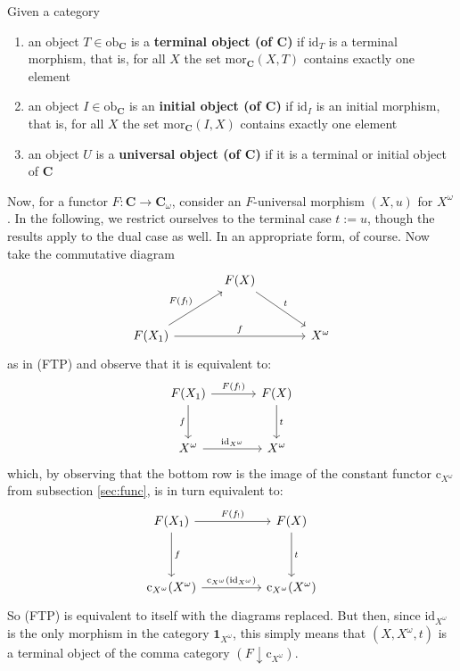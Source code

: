 Given a category
\begin{enumerate}
\item[(1)]
an object $T \in \mathrm{ob}_{\mathbf{C}}$ is a \textbf{terminal object (of $\mathbf{C}$)} if $\mathrm{id}_{T}$ is a terminal morphism, that is, for all $X$ the set $\mathrm{mor}_{\mathbf{C}}(X,T)$ contains exactly one element
\item[(2)]
an object $I \in \mathrm{ob}_{\mathbf{C}}$ is an \textbf{initial object (of $\mathbf{C}$)} if $\mathrm{id}_{I}$ is an initial morphism, that is, for all $X$ the set $\mathrm{mor}_{\mathbf{C}}(I,X)$ contains exactly one element
\item[(3)]
an object $U$ is a \textbf{universal object (of $\mathbf{C}$)} if it is a terminal or initial object of $\mathbf{C}$
\end{enumerate}
Now, for a functor $F \colon \mathbf{C} \rightarrow \mathbf{C}_{\omega}$, consider an $F$-universal morphism $(X,u)$ for $X^{\omega}$.
In the following, we restrict ourselves to the terminal case $t := u$, though the results apply to the dual case as well.
In an appropriate form, of course.
Now take the commutative diagram
\[
\begin{tikzcd}[sep=large]
  &
  F(X)
  \arrow{rd}{t}
  &
  \\
  F(X_{1})
  \arrow{ru}{F(f_{!})}
  \arrow{rr}{f}
  &
  &
  X^{\omega}
\end{tikzcd}
\]
as in (FTP) and observe that it is equivalent to:
\[
\begin{tikzcd}[sep=large]
  F(X_{1})
  \arrow[swap]{d}{f}
  \arrow{r}{F(f_{!})}
  &
  F(X)
  \arrow{d}{t}
  \\
  X^{\omega}
  \arrow{r}{\mathrm{id}_{X^{\omega}}}
  &
  X^{\omega}
\end{tikzcd}
\]
which, by observing that the bottom row is the image of the constant functor $\mathrm{c}_{X^{\omega}}$ from subsection \ref{sec:func}, is in turn equivalent to:
\[
\begin{tikzcd}[sep=huge]
  F(X_{1})
  \arrow{r}{F(f_{!})}
  \arrow{d}{f}
  &
  F(X)
  \arrow{d}{t}
  \\
  \mathrm{c}_{X^{\omega}}(X^{\omega})
  \arrow{r}{\mathrm{c}_{X^{\omega}}(\mathrm{id}_{X^{\omega}})}
  &
  \mathrm{c}_{X^{\omega}}(X^{\omega})
\end{tikzcd}
\]
So (FTP) is equivalent to itself with the diagrams replaced.
But then, since $\mathrm{id}_{X^{\omega}}$ is the only morphism in the category $\mathbf{1}_{X^{\omega}}$, this simply means that $(X,X^{\omega},t)$ is a terminal object of the comma category $(F \downarrow \mathrm{c}_{X^{\omega}})$.
